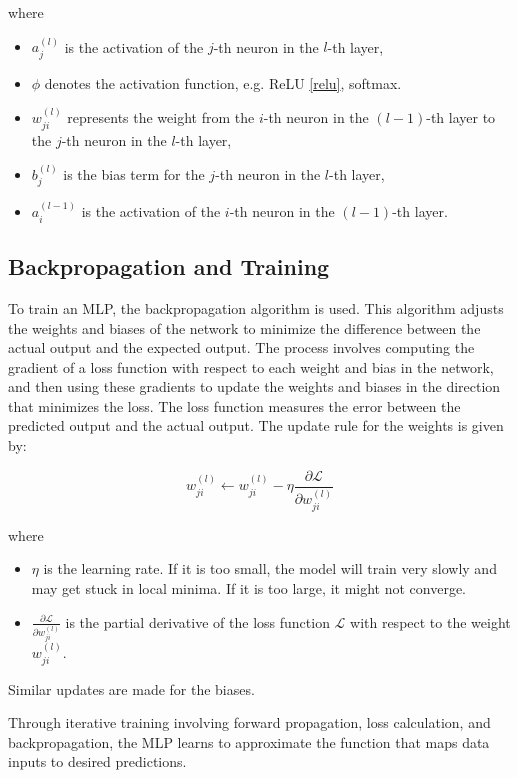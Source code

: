 where
\begin{itemize}
	\item $a^{(l)}_j$ is the activation of the $j$-th neuron in the $l$-th layer,
	\item $\phi$ denotes the activation function, e.g. ReLU \autoref{relu}, softmax.
	\item $w^{(l)}_{ji}$ represents the weight from the $i$-th neuron in the $(l-1)$-th layer to the $j$-th neuron in the $l$-th layer,
	\item $b^{(l)}_j$ is the bias term for the $j$-th neuron in the $l$-th layer,
	\item $a^{(l-1)}_i$ is the activation of the $i$-th neuron in the $(l-1)$-th layer.
\end{itemize}

\subsection{Backpropagation and Training}

To train an MLP, the backpropagation algorithm is used.
This algorithm adjusts the weights and biases of the network to minimize the difference between the actual output and the expected output.
The process involves computing the gradient of a loss function with respect to each weight and bias in the network, and then using these gradients to update the weights and biases in the direction that minimizes the loss.
The loss function measures the error between the predicted output and the actual output. The update rule for the weights is given by:

\begin{equation}
	w^{(l)}_{ji} \leftarrow w^{(l)}_{ji} - \eta \frac{\partial \mathcal{L}}{\partial w^{(l)}_{ji}}
\end{equation}

where
\begin{itemize}
	\item $\eta$ is the learning rate. If it is too small, the model will train very slowly and may get stuck in local minima. If it is too large, it might not converge.
	\item $\frac{\partial \mathcal{L}}{\partial w^{(l)}_{ji}}$ is the partial derivative of the loss function $\mathcal{L}$ with respect to the weight $w^{(l)}_{ji}$.
\end{itemize}
Similar updates are made for the biases.

Through iterative training involving forward propagation, loss calculation, and backpropagation, the MLP learns to approximate the function that maps data inputs to desired predictions.

